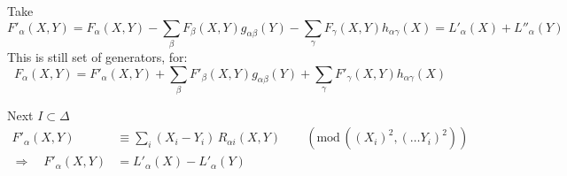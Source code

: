Take
\[
F'_\alpha(X,Y)=F_\alpha(X,Y)-\sum_\beta F_\beta(X,Y)g_{\alpha\beta}(Y)
-\sum_\gamma F_\gamma(X,Y)h_{\alpha\gamma}(X)=L'_\alpha(X)+L''_\alpha(Y)
\]
This is still set of generators, for:
\[
F_\alpha(X,Y)=F'_\alpha(X,Y)+\sum_\beta F'_\beta(X,Y)g_{\alpha\beta}(Y)+\sum_\gamma F'_\gamma(X,Y)h_{\alpha\gamma}(X)
\]

Next $I\subset\Delta$
\[
\begin{aligned}
F'_\alpha(X,Y)&\equiv\sum_i(X_i-Y_i)\,R_{\alpha i}(X,Y)\qquad
(\mathrm{mod}\,((X_i)^2,(\ldots Y_i)^2))\\
\Rightarrow\quad F'_\alpha(X,Y)&=L'_\alpha(X)-L'_\alpha(Y)
\end{aligned}
\]
